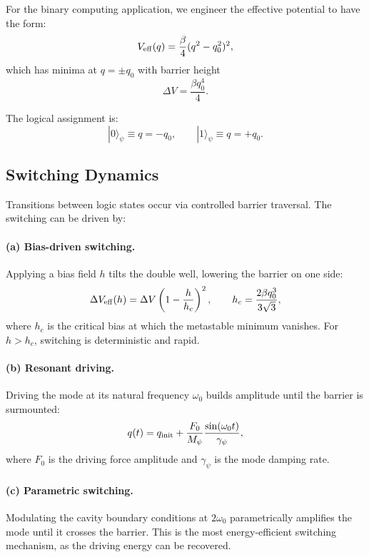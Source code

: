 \documentclass[12pt,a4paper,twoside]{article}
\begin{document}
For the binary computing application, we engineer the effective potential to have the form:
\begin{equation}
V_{\rm eff}(q) = \frac{\beta}{4}(q^2 - q_0^2)^2,
\label{eq:symmetric_dw}
\end{equation}
which has minima at $q = \pm q_0$ with barrier height
\begin{equation}
\Delta V = \frac{\beta q_0^4}{4}.
\label{eq:barrier}
\end{equation}

The logical assignment is:
\begin{equation}
|0\rangle_\psi \equiv q = -q_0, \qquad |1\rangle_\psi \equiv q = +q_0.
\label{eq:logical_states}
\end{equation}

\subsection{Switching Dynamics}\label{sec:switching}

Transitions between logic states occur via controlled barrier traversal. The switching can be driven by:

\paragraph{(a) Bias-driven switching.}
Applying a bias field $h$ tilts the double well, lowering the barrier on one side:
\begin{equation}
\Delta V_{\rm eff}(h) = \Delta V\left(1 - \frac{h}{h_c}\right)^2, \qquad h_c = \frac{2\beta q_0^3}{3\sqrt{3}},
\label{eq:biased_barrier}
\end{equation}
where $h_c$ is the critical bias at which the metastable minimum vanishes. For $h > h_c$, switching is deterministic and rapid.

\paragraph{(b) Resonant driving.}
Driving the mode at its natural frequency $\omega_0$ builds amplitude until the barrier is surmounted:
\begin{equation}
q(t) = q_{\rm init} + \frac{F_0}{M_\psi}\frac{\sin(\omega_0 t)}{\gamma_\psi},
\end{equation}
where $F_0$ is the driving force amplitude and $\gamma_\psi$ is the mode damping rate.

\paragraph{(c) Parametric switching.}
Modulating the cavity boundary conditions at $2\omega_0$ parametrically amplifies the mode until it crosses the barrier. This is the most energy-efficient switching mechanism, as the driving energy can be recovered.
\end{document}
